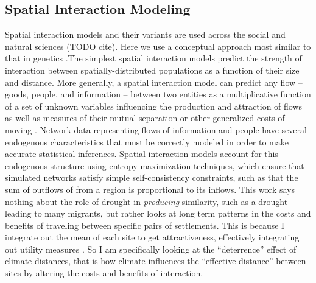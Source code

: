 \documentclass[10pt]{iopart}
\begin{document}
\subsection*{Spatial Interaction Modeling}
Spatial interaction models and their variants are used across the social and natural sciences (TODO cite). Here we use a conceptual approach most similar to that in genetics \parencite{Murphy2010}.The simplest spatial interaction models predict the strength of interaction between spatially-distributed populations as a function of their size and distance. More generally, a spatial interaction model can predict any flow -- goods, people, and information -- between two entities as a multiplicative function of a set of unknown variables influencing the production and attraction of flows as well as measures of their mutual separation or other generalized costs of moving \parencite{Sen1995,Fotheringham1989}. Network data representing flows of information and people have several endogenous characteristics that must be correctly modeled in order to make accurate statistical inferences. Spatial interaction models account for this endogenous structure using entropy maximization techniques, which ensure that simulated networks satisfy simple self-consistency constraints, such as that the sum of outflows of from a region is proportional to its inflows.
This work says nothing about the role of drought in \textit{producing} similarity, such as a drought leading to many migrants, but rather looks at long term patterns in the costs and benefits of traveling between specific pairs of settlements. This is because I integrate out the mean of each site to get attractiveness, effectively integrating out utility measures \parencite{Bavaud2002,Bavaud2008}. So I am specifically looking at the ``deterrence'' effect of climate distances, that is how climate influences the ``effective distance'' between sites by altering the costs and benefits of interaction.

\end{document}
